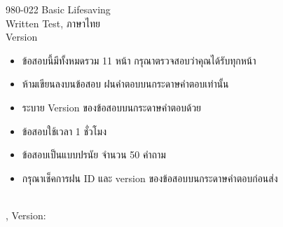 \documentclass[a4paper,16pt]{examdesign}
\begin{document}
\begin{frontmatter}
	\vspace*{2in}
	\begin{center}
		{\huge 980-022 Basic Lifesaving} \\
		\vspace{1in}
		{\huge Written Test, ภาษาไทย} \\
		\vspace{1in}
		{\huge Version } \\
		\vspace{1in}
		\begin{itemize}
		\item ข้อสอบนี้มีทั้งหมดรวม 11 หน้า กรุณาตรวจสอบว่าคุณได้รับทุกหน้า 
		\item ห้ามเขียนลงบนข้อสอบ ฝนคำตอบบนกระดาษคำตอบเท่านั้น
		\item ระบาย Version ของข้อสอบบนกระดาษคำตอบด้วย
		\item ข้อสอบใช้เวลา 1 ชั่วโมง
		\item ข้อสอบเป็นแบบปรนัย จำนวน 50 คำถาม
		\item กรุณาเช็คการฝน ID และ version ของข้อสอบบนกระดาษคำตอบก่อนส่ง
		\end{itemize}
	\end{center}
	\vfill
\end{frontmatter}


\begin{examtop}
	{\parbox{3in}{\classdata \\
	\examtype, Version: }}
\end{examtop}
\end{document}
